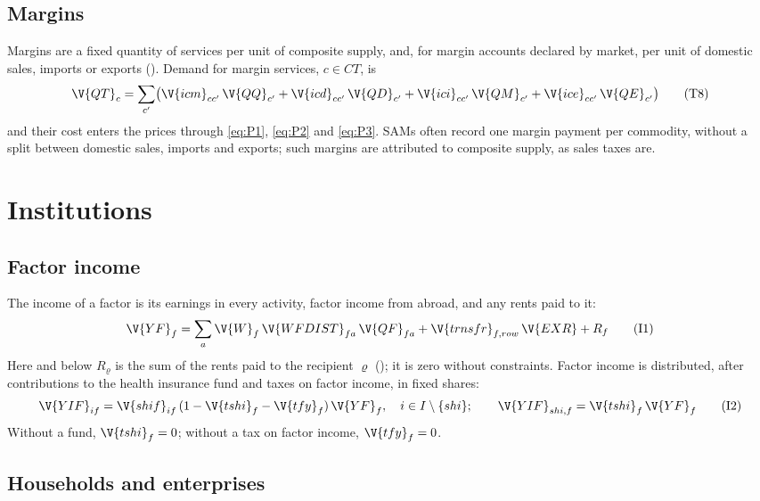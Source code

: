 \subsection{Margins}

Margins are a fixed quantity of services per unit of composite supply, and,
for margin accounts declared by market, per unit of domestic sales, imports
or exports (). Demand for margin services,
$c \in CT$, is
\begin{equation}
\V{QT}_c = \sum_{c'} \bigl(\V{icm}_{cc'}\,\V{QQ}_{c'} + \V{icd}_{cc'}\,\V{QD}_{c'}
  + \V{ici}_{cc'}\,\V{QM}_{c'} + \V{ice}_{cc'}\,\V{QE}_{c'}\bigr)
\tag{T8}\label{eq:T8}
\end{equation}
and their cost enters the prices through \eqref{eq:P1}, \eqref{eq:P2} and
\eqref{eq:P3}. SAMs often record one margin payment per commodity, without a
split between domestic sales, imports and exports; such margins are
attributed to composite supply, as sales taxes are.

\section{Institutions}\label{sec:institutions}

\subsection{Factor income}

The income of a factor is its earnings in every activity, factor income from
abroad, and any rents paid to it:
\begin{equation}
\V{YF}_f = \sum_a \V{W}_f\,\V{WFDIST}_{fa}\,\V{QF}_{fa} + \V{trnsfr}_{f,row}\,\V{EXR} + R_f
\tag{I1}\label{eq:I1}
\end{equation}
Here and below $R_\varrho$ is the sum of the rents paid to the recipient
$\varrho$ (); it is zero without constraints. Factor income
is distributed, after contributions to the health insurance fund and taxes on
factor income, in fixed shares:
\begin{equation}
\V{YIF}_{if} = \V{shif}_{if}\,(1 - \V{tshi}_f - \V{tfy}_f)\,\V{YF}_f, \quad i \in I \setminus \{shi\};
\qquad \V{YIF}_{shi,f} = \V{tshi}_f\,\V{YF}_f
\tag{I2}\label{eq:I2}
\end{equation}
Without a fund, $\V{tshi}_f = 0$; without a tax on factor income,
$\V{tfy}_f = 0$.

\subsection{Households and enterprises}

